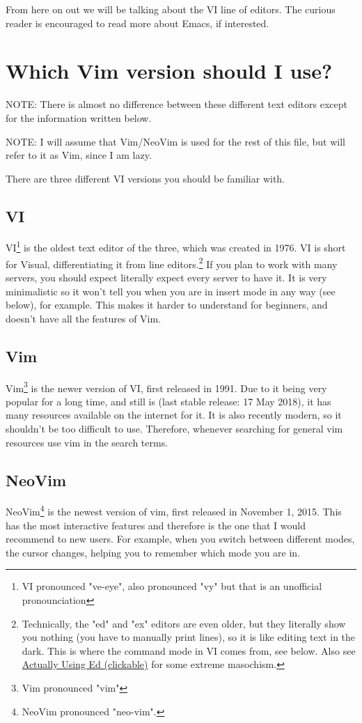 \documentclass[11pt]{article}
\begin{document}
From here on out we will be talking about the VI line of editors. The curious
reader is encouraged to read more about Emacs, if interested.
\section{Which Vim version should I use?}
\label{sec:org58b4e4a}
NOTE: There is almost no difference between these different text editors except
for the information written below.

NOTE: I will assume that Vim/NeoVim is used for the rest of this file, but will
refer to it as Vim, since I am lazy.

There are three different VI versions you should be familiar with.
\subsection{VI}
\label{sec:org4bb2cbd}
VI\footnote{VI pronounced "ve-eye", also pronounced "vy" but that is an unofficial pronounciation} is the oldest text editor of the three, which was created in 1976. VI
is short for Visual, differentiating it from line editors.\footnote{Technically, the "ed" and "ex" editors are even older, but they literally
show you nothing (you have to manually print lines), so it is like editing text
in the dark. This is where the command mode in VI comes from, see below. Also see
\href{https://sanctum.geek.nz/arabesque/actually-using-ed/}{Actually Using Ed (clickable)} for some extreme masochism.} If you plan to
work with many servers, you should expect literally expect every server to have
it. It is very minimalistic so it won't tell you when you are in insert mode in
any way (see below), for example. This makes it harder to understand for
beginners, and doesn't have all the features of Vim.
\subsection{Vim}
\label{sec:org4032ec6}
Vim\footnote{Vim pronounced "vim"} is the newer version of VI, first released in 1991. Due to it being
very popular for a long time, and still is (last stable release: 17 May 2018),
it has many resources available on the internet for it. It is also recently
modern, so it shouldn't be too difficult to use. Therefore, whenever searching
for general vim resources use vim in the search terms.
\subsection{NeoVim}
\label{sec:orgeb8be6f}
NeoVim\footnote{NeoVim pronounced "neo-vim".} is the newest version of vim, first released in November 1, 2015.
This has the most interactive features and therefore is the one that I would
recommend to new users. For example, when you switch between different modes,
the cursor changes, helping you to remember which mode you are in.
\end{document}
